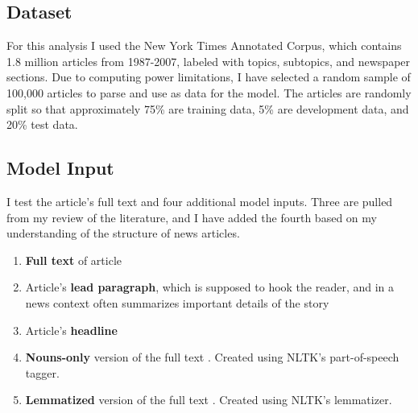\documentclass[11pt,a4paper,table]{article}
\begin{document}
\subsection{Dataset}
\label{ssec:dataset}

For this analysis I used the New York Times Annotated Corpus, which contains 1.8 million articles from 1987-2007, labeled with topics, subtopics, and newspaper sections. Due to computing power limitations, I have selected a random sample of 100,000 articles to parse and use as data for the model. The articles are randomly split so that approximately 75\% are training data, 5\% are development data, and 20\% test data.

\subsection{Model Input}
\label{ssec:input}

I test the article's full text and four additional model inputs. Three are pulled from my review of the literature,  and I have added the fourth based on my understanding of the structure of news articles.

\begin{enumerate}
\item \textbf{Full text} of article
\item Article's \textbf{lead paragraph}, which is supposed to hook the reader, and in a news context often summarizes important details of the story \cite{NPR}
\item Article's \textbf{headline} \cite{Wermter:02}
\item \textbf{Nouns-only} version of the full text \cite{Martin:15}. Created using NLTK's part-of-speech tagger.
\item \textbf{Lemmatized} version of the full text \cite{Martin:15}. Created using NLTK's lemmatizer.
\end{enumerate}
\end{document}
